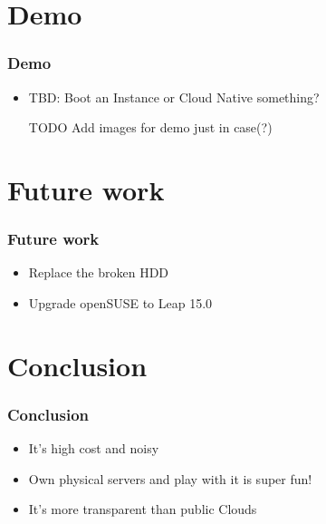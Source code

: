 \documentclass[aspectratio=169,11pt,hyperref={colorlinks=true}]{beamer}
\begin{document}
\section{Demo}
\begin{frame}
  \frametitle{Demo}
  \begin{itemize}
    \item TBD: Boot an Instance or Cloud Native something?
    \item [TODO] Add images for demo just in case(?)
  \end{itemize}
\end{frame}

\section{Future work}
\begin{frame}
  \frametitle{Future work}
  \begin{itemize}
    \item Replace the broken HDD
    \item Upgrade openSUSE to Leap 15.0
  \end{itemize}
\end{frame}

\section{Conclusion}
\begin{frame}
  \frametitle{Conclusion}
  \begin{itemize}
    \item It's high cost and noisy
    \item Own physical servers and play with it is super fun!
    \item It's more transparent than public Clouds
  \end{itemize}
\end{frame}
\end{document}
